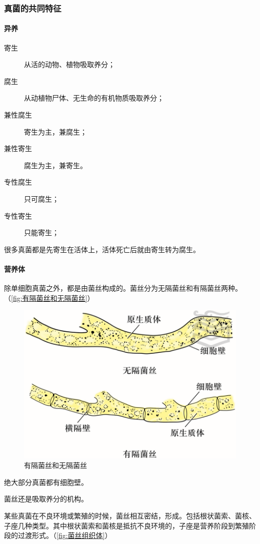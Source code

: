 \subsubsection{真菌的共同特征}

\paragraph{异养}

\begin{description}
	\item[寄生] 从活的动物、植物吸取养分；
	\item[腐生] 从动植物尸体、无生命的有机物质吸取养分；
	\item[兼性腐生] 寄生为主，兼腐生；
	\item[兼性寄生] 腐生为主，兼寄生。
	\item[专性腐生] 只可腐生；
	\item[专性寄生] 只能寄生；
\end{description}

很多真菌都是先寄生在活体上，活体死亡后就由寄生转为腐生。

\paragraph{营养体}

除单细胞真菌之外，都是由菌丝构成的。菌丝分为无隔菌丝和有隔菌丝两种。（\autoref{fig:有隔菌丝和无隔菌丝}）

\begin{figure}
	\centering
	\includegraphics[width=0.7\linewidth]{Pics/菌丝的种类}
	\caption{有隔菌丝和无隔菌丝}
	\label{fig:有隔菌丝和无隔菌丝}
\end{figure}

绝大部分真菌都有细胞壁。

菌丝还是吸取养分的机构。

某些真菌在不良环境或繁殖的时候，菌丝相互密结，形成。包括根状菌索、菌核、子座几种类型。其中根状菌索和菌核是抵抗不良环境的，子座是营养阶段到繁殖阶段的过渡形式。（\autoref{fig:菌丝组织体}）

